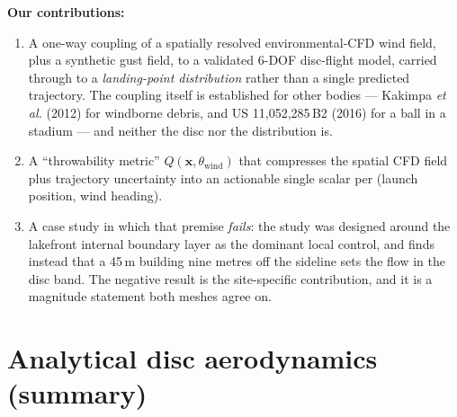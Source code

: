 \documentclass[11pt,letterpaper]{article}
\begin{document}
\textbf{Our contributions:}
\begin{enumerate}[leftmargin=*,itemsep=2pt]
  \item A one-way coupling of a spatially resolved environmental-CFD wind field, plus a synthetic gust field, to a validated 6-DOF disc-flight model, carried through to a \emph{landing-point distribution} rather than a single predicted trajectory. The coupling itself is established for other bodies --- Kakimpa \emph{et al.} (2012) for windborne debris, and US 11{,}052{,}285\,B2 (2016) for a ball in a stadium --- and neither the disc nor the distribution is.
  \item A ``throwability metric'' $Q(\mathbf{x}, \theta_{\text{wind}})$ that compresses the spatial CFD field plus trajectory uncertainty into an actionable single scalar per (launch position, wind heading).
  \item A case study in which that premise \emph{fails}: the study was designed around the
  lakefront internal boundary layer as the dominant local control, and finds instead that a
  45\,m building nine metres off the sideline sets the flow in the disc band. The negative
  result is the site-specific contribution, and it is a magnitude statement both meshes
  agree on.
\end{enumerate}

\section{Analytical disc aerodynamics (summary)}
\label{sec:analytical}
\end{document}
